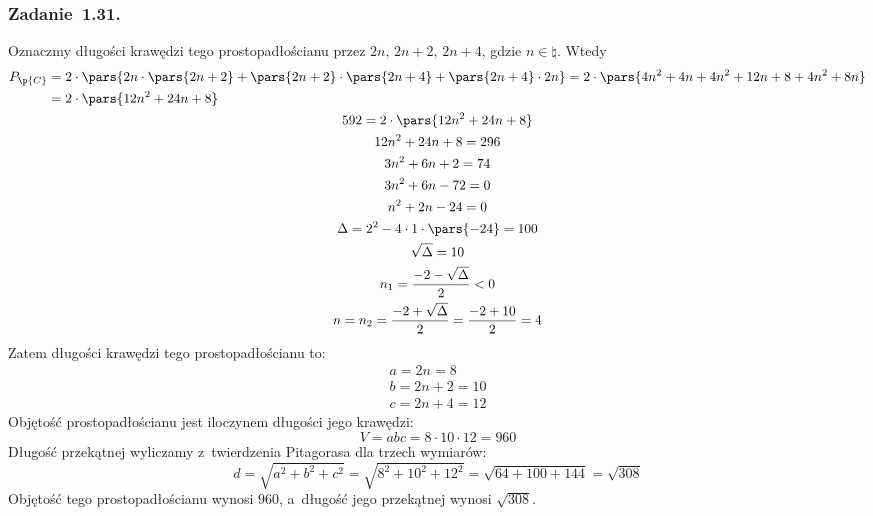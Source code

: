 \subsubsection*{Zadanie~1.31.}
Oznaczmy długości krawędzi tego prostopadłościanu przez \(2n\), \(2n + 2\), \(2n + 4\), gdzie \(n \in \natural\). Wtedy
\begin{gather*}
    \begin{split}
        P_\p{C}
        &= 2 \cdot \pars{2n \cdot \pars{2n + 2} + \pars{2n + 2} \cdot \pars{2n + 4} + \pars{2n + 4} \cdot 2n}
        = 2 \cdot \pars{4n^2 + 4n + 4n^2 + 12n + 8 + 4n^2 + 8n}\\
        &= 2 \cdot \pars{12n^2 + 24n + 8}
    \end{split}\\
    592 = 2 \cdot \pars{12n^2 + 24n + 8}\\
    12n^2 + 24n + 8 = 296\\
    3n^2 + 6n + 2 = 74\\
    3n^2 + 6n - 72 = 0\\
    n^2 + 2n - 24 = 0\\
    \Delta = 2^2 - 4 \cdot 1 \cdot \pars{-24} = 100\\
    \sqrt{\Delta} = 10\\
    n_1 = \frac{-2 - \sqrt{\Delta}}{2} < 0\\
    n = n_2 = \frac{-2 + \sqrt{\Delta}}{2}
    = \frac{-2 + 10}{2} = 4
\end{gather*}
Zatem długości krawędzi tego prostopadłościanu to:
\begin{gather*}
    a = 2n = 8\\
    b = 2n + 2 = 10\\
    c = 2n + 4 = 12
\end{gather*}
Objętość prostopadłościanu jest iloczynem długości jego krawędzi:
\begin{equation*}
    V = abc = 8 \cdot 10 \cdot 12 = 960
\end{equation*}
Długość przekątnej wyliczamy z~twierdzenia Pitagorasa dla trzech wymiarów:
\begin{equation*}
    d = \sqrt{a^2 + b^2 + c^2}
    = \sqrt{8^2 + 10^2 + 12^2}
    = \sqrt{64 + 100 + 144}
    = \sqrt{308}
\end{equation*}
Objętość tego prostopadłościanu wynosi \(960\), a~długość jego przekątnej wynosi \(\sqrt{308}\).
